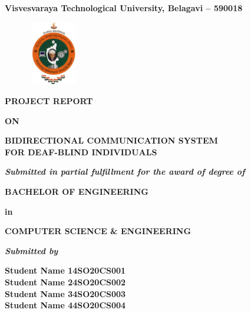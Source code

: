 \documentclass[12pt,a4paper]{report}
\begin{document}
\pagestyle{empty}
\begin{center}

{\large \textbf{Visvesvaraya Technological University, Belagavi – 590018}}
\begin{figure}[hbtp]
\centering
\includegraphics[width=2.3cm,height=2.8cm]{./pic/vtu}
\end{figure}

\textbf{PROJECT REPORT}
\par
\textbf{ON}
\par
\vspace{8pt}
{\Large\textbf{BIDIRECTIONAL COMMUNICATION SYSTEM \\[0.3em] FOR DEAF-BLIND INDIVIDUALS}}
\par
\vspace{10pt}
\par
\textit{\textbf{Submitted in partial fulfillment for the award of degree of }}
\par
\vspace{12pt}
\large \textbf{BACHELOR OF ENGINEERING }
\par
\textbf{in}
\par
\large \textbf{COMPUTER SCIENCE \& ENGINEERING}
\par
\vspace{12pt}
\textit{\textbf{Submitted by}}
\vspace{8pt}

\textbf{\large Student Name 1}\qquad \qquad \qquad \qquad \textbf{\large 4SO20CS001}\\ \vspace{3pt} 
\textbf{\large Student Name 2}\qquad \qquad \qquad \qquad \textbf{\large 4SO20CS002}\\ \vspace{3pt}
\textbf{\large Student Name 3}\qquad \qquad \qquad \qquad \textbf{\large 4SO20CS003}\\ \vspace{3pt}
\textbf{\large Student Name 4}\qquad \qquad \qquad \qquad \textbf{\large 4SO20CS004}\\ \vspace{3pt}


\end{center}
\end{document}
